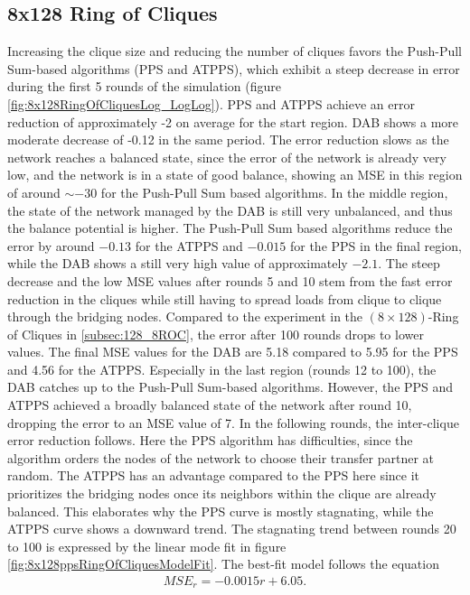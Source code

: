 \subsection{8x128 Ring of Cliques}\label{subsec:8_128ROC}
Increasing the clique size and reducing the number of cliques favors the Push-Pull Sum-based algorithms (PPS and ATPPS), which exhibit a steep decrease in error during the first 5 rounds of the simulation (figure \ref{fig:8x128RingOfCliquesLog_LogLog}). PPS and ATPPS achieve an error reduction of approximately -2 on average for the start region. DAB shows a more moderate decrease of -0.12 in the same period. The error reduction slows as the network reaches a balanced state, since the error of the network is already very low, and the network is in a state of good balance, showing an MSE in this region of around $\sim -30$ for the Push-Pull Sum based algorithms. In the middle region, the state of the network managed by the DAB is still very unbalanced, and thus the balance potential is higher. The Push-Pull Sum based algorithms reduce the error by around $-0.13$ for the ATPPS and $-0.015$ for the PPS in the final region, while the DAB shows a still very high value of approximately $-2.1$. The steep decrease and the low MSE values after rounds 5 and 10 stem from the fast error reduction in the cliques while still having to spread loads from clique to clique through the bridging nodes. Compared to the experiment in the $(8 \times 128)$-Ring of Cliques in \ref{subsec:128_8ROC}, the error after 100 rounds drops to lower values. The final MSE values for the DAB are 5.18 compared to 5.95 for the PPS and 4.56 for the ATPPS. Especially in the last region (rounds 12 to 100), the DAB catches up to the Push-Pull Sum-based algorithms. However, the PPS and ATPPS achieved a broadly balanced state of the network after round 10, dropping the error to an MSE value of 7. In the following rounds, the inter-clique error reduction follows. Here the PPS algorithm has difficulties, since the algorithm orders the nodes of the network to choose their transfer partner at random. The ATPPS has an advantage compared to the PPS here since it prioritizes the bridging nodes once its neighbors within the clique are already balanced. This elaborates why the PPS curve is mostly stagnating, while the ATPPS curve shows a downward trend. The stagnating trend between rounds 20 to 100 is expressed by the linear mode fit in figure \ref{fig:8x128ppsRingOfCliquesModelFit}. The best-fit model follows the equation
\begin{align}
    MSE_r=-0.0015r+6.05. 
\end{align}
